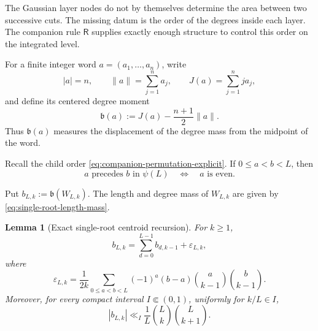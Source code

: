\documentclass[11pt]{article}
\newtheorem{lemma}[theorem]{Lemma}
\theoremstyle{definition}
\theoremstyle{remark}
\begin{document}
The Gaussian layer nodes do not by themselves determine the area between two
successive cuts.  The missing datum is the order of the degrees inside each
layer.  The companion rule \(\mathsf R\) supplies exactly enough structure to
control this order on the integrated level.

For a finite integer word \(a=(a_1,\ldots,a_n)\), write
\begin{equation}
 |a|=n,\qquad \|a\|=\sum_{j=1}^n a_j,\qquad
 J(a)=\sum_{j=1}^n j a_j,
\end{equation}
and define its centered degree moment
\begin{equation}
 {
 \mathfrak b(a):=J(a)-\frac{n+1}{2}\|a\|.
 }
 \label{eq:centered-degree-bias}
\end{equation}
Thus \(\mathfrak b(a)\) measures the displacement of the degree mass from the
midpoint of the word.

Recall the child order \eqref{eq:companion-permutation-explicit}.  If
\(0\le a<b<L\), then
\begin{equation}
 a\text{ precedes }b\text{ in }\psi(L)
 \quad\Longleftrightarrow\quad a\text{ is even}.
 \label{eq:pair-order-parity}
\end{equation}

Put \(b_{L,k}:=\mathfrak b(W_{L,k})\).  The length and degree mass of
\(W_{L,k}\) are given by \eqref{eq:single-root-length-mass}.

\begin{lemma}[Exact single-root centroid recursion]
\label{lem:single-root-centroid-recursion}
For \(k\ge1\),
\begin{equation}
 {
 b_{L,k}
 =\sum_{d=0}^{L-1}b_{d,k-1}+\varepsilon_{L,k},
 }
 \label{eq:single-root-bias-recursion}
\end{equation}
where
\begin{equation}
 {
 \varepsilon_{L,k}
 =\frac{1}{2k}
 \sum_{0\le a<b<L}
 (-1)^a(b-a)
 \binom{a}{k-1}\binom{b}{k-1}.
 }
 \label{eq:parity-forcing-centroid}
\end{equation}
Moreover, for every compact interval \(I\Subset(0,1)\), uniformly for
\(k/L\in I\),
\begin{equation}
 {
 |b_{L,k}|
 \ll_I
 \frac1L\binom Lk\binom L{k+1}.
 }
 \label{eq:single-root-centroid-bound}
\end{equation}
\end{lemma}
\end{document}
